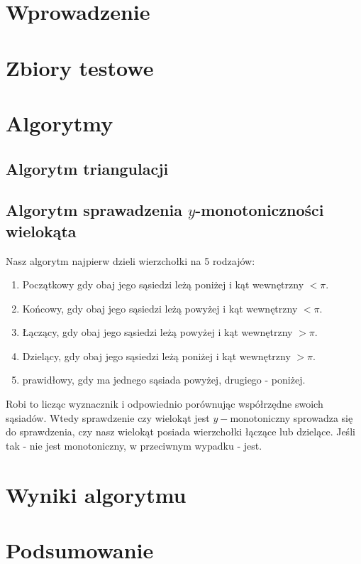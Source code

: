 \documentclass{sprawozdanie-agh}
\begin{document}

\stronatytulowa{}

\section{Wprowadzenie}


\section{Zbiory testowe}


\section{Algorytmy}
\subsection{Algorytm triangulacji}

\subsection{Algorytm sprawadzenia $y$-monotoniczności wielokąta}
\quad Nasz algorytm najpierw dzieli wierzchołki na 5 rodzajów: 
\begin{enumerate}
    \item Początkowy gdy obaj jego sąsiedzi leżą
    poniżej i kąt wewnętrzny $< \pi$.
    \item Końcowy, gdy obaj jego sąsiedzi leżą
    powyżej i kąt wewnętrzny $< \pi$.
    \item Łączący, gdy obaj jego sąsiedzi leżą
    powyżej i kąt wewnętrzny $> \pi$.
    \item Dzielący, gdy obaj jego sąsiedzi leżą
    poniżej i kąt wewnętrzny $> \pi$.
    \item prawidłowy, gdy ma jednego sąsiada powyżej, drugiego - poniżej.
\end{enumerate}

Robi to licząc wyznacznik i odpowiednio porównując współrzędne swoich sąsiadów. 
Wtedy sprawdzenie czy wielokąt jest $y-$monotoniczny sprowadza się do sprawdzenia, czy nasz 
wielokąt posiada wierzchołki łączące lub dzielące. Jeśli tak - nie jest monotoniczny, w przeciwnym wypadku - jest.
\newpage
\section{Wyniki algorytmu}

\section{Podsumowanie}

\end{document}
